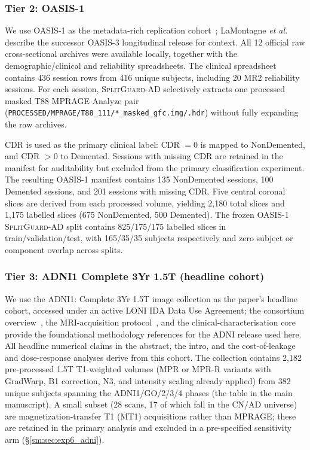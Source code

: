 \documentclass[11pt]{article}
\newcommand{\SGA}{\textsc{SplitGuard-AD}}
\newcommand{\etal}{\textit{et al.}}
\providecommand{\pb}{\discretionary{}{}{}}
\begin{document}
\subsubsection{Tier 2: OASIS-1}
\label{sm:sec:data_oasis}
We use OASIS-1 as the metadata-rich replication
cohort~\cite{oasis1}; LaMontagne \etal~\cite{lamontagne2019oasis3}
describe the successor OASIS-3 longitudinal release for context.
All 12 official raw cross-sectional archives were available locally,
together with the demographic/clinical and reliability spreadsheets.
The clinical spreadsheet contains 436 session rows from 416 unique
subjects, including 20 MR2 reliability sessions.
For each session, \SGA{} selectively extracts one processed masked T88
MPRAGE Analyze pair
(\texttt{PROCESSED/\pb MPRAGE/\pb T88\_111/\pb *\_masked\_gfc.img/\pb .hdr}) without
fully expanding the raw archives.

CDR is used as the primary clinical label: CDR \(=0\) is mapped to
NonDemented, and CDR \(>0\) to Demented.
Sessions with missing CDR are retained in the manifest for auditability
but excluded from the primary classification experiment.
The resulting OASIS-1 manifest contains 135 NonDemented sessions,
100 Demented sessions, and 201 sessions with missing CDR.
Five central coronal slices are derived from each processed volume,
yielding 2,180 total slices and 1,175 labelled slices
(675 NonDemented, 500 Demented).
The frozen OASIS-1 \SGA{} split contains 825/175/175 labelled slices in
train/validation/test, with 165/35/35 subjects respectively and zero
subject or component overlap across splits.

\subsubsection{Tier 3: ADNI1 Complete 3Yr 1.5T (headline cohort)}
\label{sm:sec:data_adni}
We use the ADNI1: Complete 3Yr 1.5T image collection as the paper's
headline cohort, accessed under an active LONI IDA Data Use Agreement;
the consortium overview~\cite{adni}, the MRI-acquisition
protocol~\cite{jack2008adnimri}, and the clinical-characterisation
core~\cite{petersen2010adniclinical} provide the foundational
methodology references for the ADNI release used here. All headline
numerical claims in the abstract, the intro, and the cost-of-leakage
and dose-response analyses derive from this cohort.
The collection contains 2,182 pre-processed 1.5T T1-weighted volumes
(MPR or MPR-R variants with GradWarp, B1 correction, N3, and intensity
scaling already applied) from 382 unique subjects spanning the
ADNI1/GO/2/3/4 phases (the table in the main manuscript).
A small subset (28 scans, 17 of which fall in the CN/AD universe) are
magnetization-transfer T1 (MT1) acquisitions rather than MPRAGE; these
are retained in the primary analysis and excluded in a pre-specified
sensitivity arm (\S\ref{sm:sec:exp6_adni}).
\end{document}
